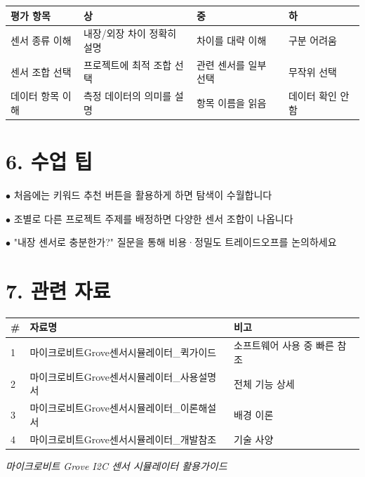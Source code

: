 \documentclass[11pt,a4paper]{article}
\begin{document}
\begin{center}
\renewcommand{\arraystretch}{1.4}
\begin{tabular}{|p{3.0cm}|p{4.9cm}|p{3.9cm}|p{3.2cm}|}
\hline
\rowcolor{tableheader}
\textbf{평가 항목} & \textbf{상} & \textbf{중} & \textbf{하} \\
\hline
센서 종류 이해 & 내장/외장 차이 정확히 설명 & 차이를 대략 이해 & 구분 어려움 \\
\hline
센서 조합 선택 & 프로젝트에 최적 조합 선택 & 관련 센서를 일부 선택 & 무작위 선택 \\
\hline
데이터 항목 이해 & 측정 데이터의 의미를 설명 & 항목 이름을 읽음 & 데이터 확인 안 함 \\
\hline
\end{tabular}
\end{center}


\section*{6. 수업 팁}

$\bullet$  처음에는 키워드 추천 버튼을 활용하게 하면 탐색이 수월합니다

$\bullet$  조별로 다른 프로젝트 주제를 배정하면 다양한 센서 조합이 나옵니다

$\bullet$  "내장 센서로 충분한가?" 질문을 통해 비용·정밀도 트레이드오프를 논의하세요



\section*{7. 관련 자료}

\begin{center}
\renewcommand{\arraystretch}{1.4}
\begin{tabular}{|p{1.5cm}|p{7.7cm}|p{5.8cm}|}
\hline
\rowcolor{tableheader}
\textbf{\#} & \textbf{자료명} & \textbf{비고} \\
\hline
1 & 마이크로비트Grove센서시뮬레이터\_퀵가이드 & 소프트웨어 사용 중 빠른 참조 \\
\hline
2 & 마이크로비트Grove센서시뮬레이터\_사용설명서 & 전체 기능 상세 \\
\hline
3 & 마이크로비트Grove센서시뮬레이터\_이론해설서 & 배경 이론 \\
\hline
4 & 마이크로비트Grove센서시뮬레이터\_개발참조 & 기술 사양 \\
\hline
\end{tabular}
\end{center}


\vfill
\begin{center}
\small\color{lightbrown}
\textit{마이크로비트 Grove I2C 센서 시뮬레이터 활용가이드}
\end{center}
\end{document}
